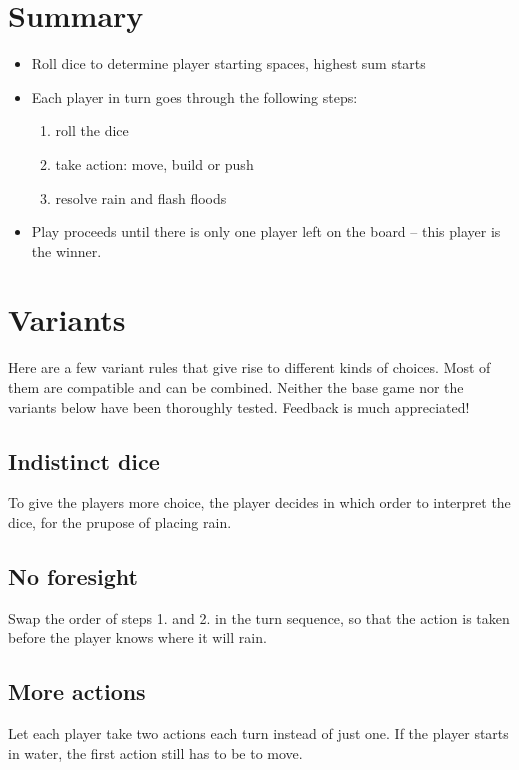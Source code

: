 \section{Summary}
\begin{itemize}
    \item Roll dice to determine player starting spaces, highest sum starts
    \item Each player in turn goes through the following steps:
    \begin{enumerate}
        \item roll the dice
        \item take action: move, build or push
        \item resolve rain and flash floods
    \end{enumerate}
    \item Play proceeds until there is only one player left on the board
        -- this player is the winner.
\end{itemize}


\newpage

\section{Variants}
Here are a few variant rules that give rise to different kinds of choices.
Most of them are compatible and can be combined. Neither the base game nor the
variants below have been thoroughly tested. Feedback is much appreciated!

\subsection{Indistinct dice}
To give the players more choice, the player decides in which order to interpret
the dice, for the prupose of placing rain.

\subsection{No foresight}
Swap the order of steps 1. and 2. in the turn sequence, so that the action is
taken before the player knows where it will rain.

\subsection{More actions}
Let each player take two actions each turn instead of just one. If the player
starts in water, the first action still has to be to move.

